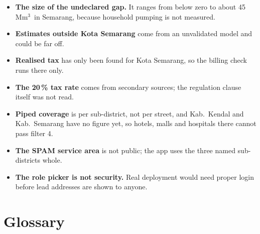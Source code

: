 \documentclass[11pt,a4paper]{article}
\newcommand{\Mm}{\,Mm$^{3}$}
\begin{document}
\begin{itemize}
\item \textbf{The size of the undeclared gap.} It ranges from below zero to about 45\Mm\ in Semarang,
  because household pumping is not measured.
\item \textbf{Estimates outside Kota Semarang} come from an unvalidated model and could be far off.
\item \textbf{Realised tax} has only been found for Kota Semarang, so the billing check runs there only.
\item \textbf{The 20\,\% tax rate} comes from secondary sources; the regulation clause itself was not read.
\item \textbf{Piped coverage} is per sub-district, not per street, and Kab.\ Kendal and Kab.\ Semarang have
  no figure yet, so hotels, malls and hospitals there cannot pass filter 4.
\item \textbf{The SPAM service area} is not public; the app uses the three named sub-districts whole.
\item \textbf{The role picker is not security.} Real deployment would need proper login before lead
  addresses are shown to anyone.
\end{itemize}

\section{Glossary}\label{sec:gloss}
\end{document}
